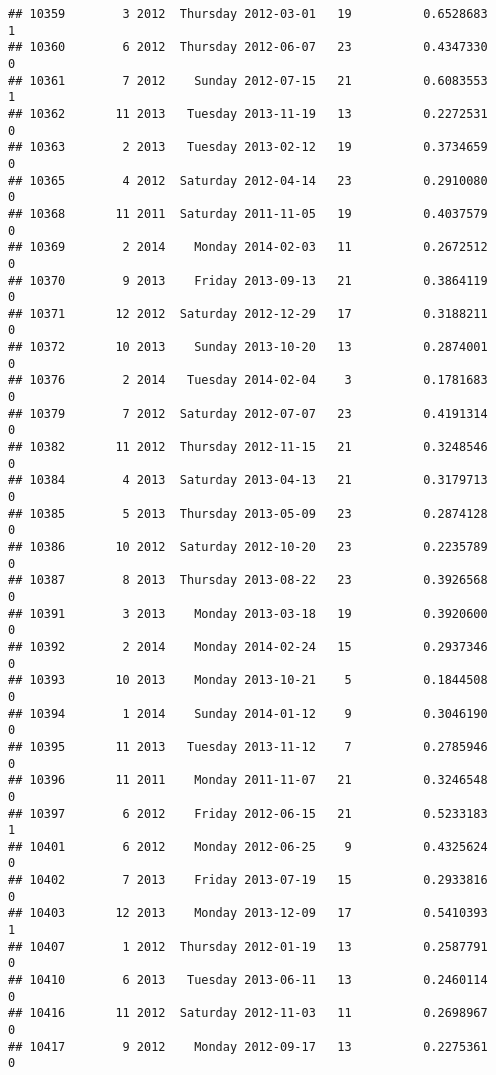 \documentclass[
]{article}
\begin{document}
\begin{verbatim}
## 10359        3 2012  Thursday 2012-03-01   19          0.6528683             1
## 10360        6 2012  Thursday 2012-06-07   23          0.4347330             0
## 10361        7 2012    Sunday 2012-07-15   21          0.6083553             1
## 10362       11 2013   Tuesday 2013-11-19   13          0.2272531             0
## 10363        2 2013   Tuesday 2013-02-12   19          0.3734659             0
## 10365        4 2012  Saturday 2012-04-14   23          0.2910080             0
## 10368       11 2011  Saturday 2011-11-05   19          0.4037579             0
## 10369        2 2014    Monday 2014-02-03   11          0.2672512             0
## 10370        9 2013    Friday 2013-09-13   21          0.3864119             0
## 10371       12 2012  Saturday 2012-12-29   17          0.3188211             0
## 10372       10 2013    Sunday 2013-10-20   13          0.2874001             0
## 10376        2 2014   Tuesday 2014-02-04    3          0.1781683             0
## 10379        7 2012  Saturday 2012-07-07   23          0.4191314             0
## 10382       11 2012  Thursday 2012-11-15   21          0.3248546             0
## 10384        4 2013  Saturday 2013-04-13   21          0.3179713             0
## 10385        5 2013  Thursday 2013-05-09   23          0.2874128             0
## 10386       10 2012  Saturday 2012-10-20   23          0.2235789             0
## 10387        8 2013  Thursday 2013-08-22   23          0.3926568             0
## 10391        3 2013    Monday 2013-03-18   19          0.3920600             0
## 10392        2 2014    Monday 2014-02-24   15          0.2937346             0
## 10393       10 2013    Monday 2013-10-21    5          0.1844508             0
## 10394        1 2014    Sunday 2014-01-12    9          0.3046190             0
## 10395       11 2013   Tuesday 2013-11-12    7          0.2785946             0
## 10396       11 2011    Monday 2011-11-07   21          0.3246548             0
## 10397        6 2012    Friday 2012-06-15   21          0.5233183             1
## 10401        6 2012    Monday 2012-06-25    9          0.4325624             0
## 10402        7 2013    Friday 2013-07-19   15          0.2933816             0
## 10403       12 2013    Monday 2013-12-09   17          0.5410393             1
## 10407        1 2012  Thursday 2012-01-19   13          0.2587791             0
## 10410        6 2013   Tuesday 2013-06-11   13          0.2460114             0
## 10416       11 2012  Saturday 2012-11-03   11          0.2698967             0
## 10417        9 2012    Monday 2012-09-17   13          0.2275361             0

\end{verbatim}
\end{document}
